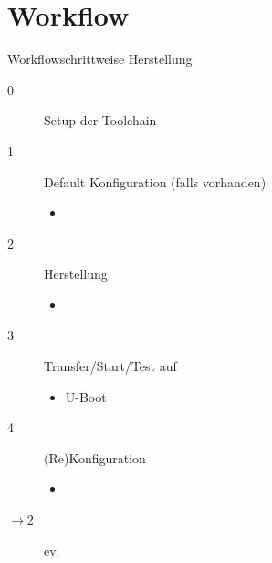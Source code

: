 \section{Workflow}
\begin{frame}{Workflow}{schrittweise Herstellung}
\begin{description}
 \item[0] Setup der Toolchain
 \item[1] Default Konfiguration (falls vorhanden)
 \begin{itemize}
  \item {}
 \end{itemize}
 \item[2] Herstellung 
  \begin{itemize}
   \item {}
  \end{itemize}
 \item[3] Transfer/Start/Test auf \target
 \begin{itemize}
  \item U-Boot 
 \end{itemize}
 \item[4] (Re)Konfiguration
 \begin{itemize}
  \item {}
 \end{itemize}
 \item[$\to$2]  ev.  
\end{description}
\end{frame}
